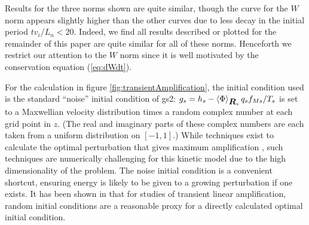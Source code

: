 \documentclass[12pt,superscriptaddress]{revtex4}
\newcommand{\vect}[1]{\mbox{\boldmath $#1$}}
\begin{document}
Results for the three norms shown are quite similar,
though the curve for the $W$ norm appears slightly higher than the other curves
due to less decay in the initial period $t v_i / L_n <20$.
Indeed, we find
all results described or plotted for the remainder of this paper are quite similar
for all of these norms.
Henceforth we restrict our attention to the $W$ norm since it is well motivated
by the conservation equation (\ref{eq:dWdt}).

For the calculation in figure \ref{fig:transientAmplification}, the initial condition used
is the standard ``noise'' initial condition of gs2:
$g_s = h_s - \left< \Phi\right>_{\vect{R}_s} q_s f_{Ms} / T_s$ is set to a Maxwellian velocity distribution
times a random complex number at each grid point in $z$.
(The real and imaginary parts of these complex numbers are each taken from a uniform distribution on $[-1,1]$.)
While techniques exist to calculate the optimal perturbation
that gives maximum amplification \cite{FarrellIoannou, SquirePRL, SquireApJ}, such techniques
are numerically challenging for this kinetic model due to the high dimensionality
of the problem.
The noise initial condition is a convenient shortcut, ensuring energy is likely
to be given to a growing perturbation if one exists.
It has been shown in \cite{Camargo, SquireApJ} that for studies of transient linear
amplification, random initial conditions are a reasonable proxy
for a directly calculated optimal initial condition.
\end{document}
